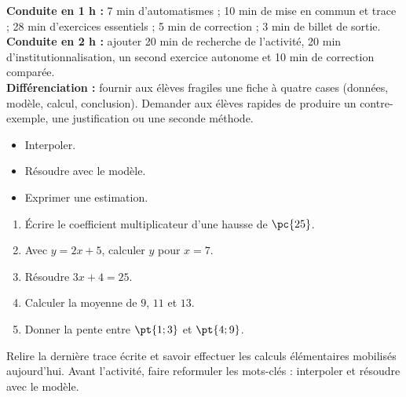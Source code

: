 \ifmxteacher
\begin{method}
\textbf{Conduite en 1 h :} 7 min d'automatismes ; 10 min de mise en commun et trace ; 28 min d'exercices essentiels ; 5 min de correction ; 3 min de billet de sortie.\\
\textbf{Conduite en 2 h :} ajouter 20 min de recherche de l'activité, 20 min d'institutionnalisation, un second exercice autonome et 10 min de correction comparée.\\
\textbf{Différenciation :} fournir aux élèves fragiles une fiche à quatre cases (données, modèle, calcul, conclusion). Demander aux élèves rapides de produire un contre-exemple, une justification ou une seconde méthode.
\end{method}
\fi
{}
\begin{objectives}\begin{itemize}\item Interpoler.\item Résoudre avec le modèle.\item Exprimer une estimation.\end{itemize}\end{objectives}
\begin{fluency}\begin{enumerate}\item Écrire le coefficient multiplicateur d'une hausse de $\pc{25}$. \item Avec $y=2x+5$, calculer $y$ pour $x=7$. \item Résoudre $3x+4=25$. \item Calculer la moyenne de $9$, $11$ et $13$. \item Donner la pente entre $\pt{1;3}$ et $\pt{4;9}$. \end{enumerate}\end{fluency}
\begin{prerequisites}Relire la dernière trace écrite et savoir effectuer les calculs élémentaires mobilisés aujourd'hui. Avant l'activité, faire reformuler les mots-clés : interpoler et résoudre avec le modèle.\end{prerequisites}

